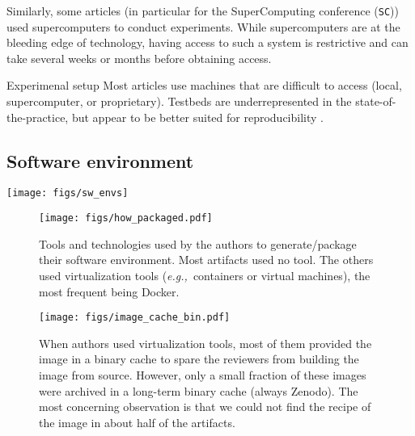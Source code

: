 \documentclass[sigconf,natbib=false]{acmart}
\newcommand{\eg}{\emph{e.g.,}}
\newcommand{\ad}{Artifact Description}
\newcommand{\aeval}{Artifact Evaluation}
\begin{document}
Similarly, some articles (in particular for the SuperComputing conference (\texttt{SC})) used supercomputers to conduct experiments.
While supercomputers are at the bleeding edge of technology, having access to such a system is restrictive and can take several weeks or months before obtaining access.

\begin{lesson}{Experimenal setup}{}
  Most articles use machines that are difficult to access (local, supercomputer, or proprietary). 
  Testbeds are underrepresented in the state-of-the-practice, but appear to be better suited for reproducibility \cite{nussbaum2017testbeds}.
\end{lesson}

\subsection{Software environment}\label{sec:sop:sw}

\begin{figure*}
  \centering
  \texttt{[image: figs/sw\_envs]}
  \caption{Techniques used to share the software environment in the \ad s. Note than an article can use several of these techniques.}\label{fig:sw_envs}
\end{figure*}

\begin{figure*}
  \centering
  \begin{subfigure}{0.49\textwidth}
    \centering
    \texttt{[image: figs/how\_packaged.pdf]}
    \caption{Tools and technologies used by the authors to generate/package their software environment.
    Most artifacts used no tool.
    The others used virtualization tools (\eg\ containers or virtual machines), the most frequent being Docker.}\label{fig:techno}
  \end{subfigure}
  \hfill
  \begin{subfigure}{0.49\textwidth}
      \centering
      \texttt{[image: figs/image\_cache\_bin.pdf]}
    \caption{When authors used virtualization tools, most of them provided the image in a binary cache to spare the reviewers from building the image from source.
    However, only a small fraction of these images were archived in a long-term binary cache (always Zenodo).
    The most concerning observation is that we could not find the recipe of the image in about half of the artifacts.}\label{fig:cache_bin}
  \end{subfigure}
  \caption{Tools and technologies used to generate and package the software environment for the \aeval\ (Figure \ref{fig:techno}), and the state of the image and its recipe in the case of the use of virtual tools (Figure \ref{fig:cache_bin}).}\label{fig:techo_cache}
\end{figure*}
\end{document}
